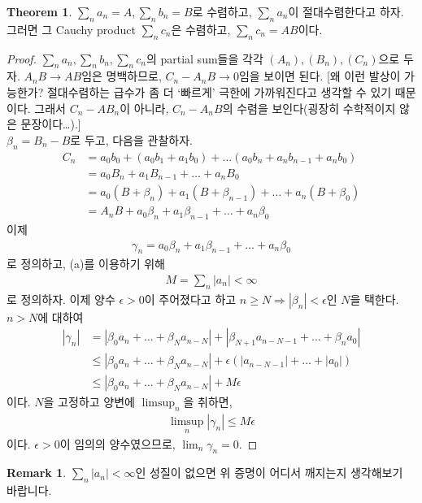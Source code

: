 \documentclass[12pt]{article}
\theoremstyle{definition}
\newtheorem{thm}{Theorem}[section]
\newtheorem*{rem}{Remark}
\def\eps{\epsilon}
\newcommand{\abs}[1]{\left\vert#1\right\vert}
\begin{document}
\begin{thm}
	\(\sum_n a_n=A, \sum_n b_n=B\)로 수렴하고, \(\sum_n a_n\)이 절대수렴한다고 하자. 그러면 그 Cauchy product \(\sum_n c_n\)은 수렴하고, \(\sum_n c_n = AB\)이다.
\end{thm}
\begin{proof}
	\(\sum_n a_n, \sum_n b_n, \sum_n c_n\)의 partial sum들을 각각 \((A_n), (B_n), (C_n)\)으로 두자. \(A_n B \rightarrow AB\)임은 명백하므로, \(C_n - A_n B \rightarrow 0\)임을 보이면 된다. [왜 이런 발상이 가능한가? 절대수렴하는 급수가 좀 더 `빠르게' 극한에 가까워진다고 생각할 수 있기 때문이다. 그래서 \(C_n - A B_n\)이 아니라, \(C_n - A_n B\)의 수렴을 보인다(굉장히 수학적이지 않은 문장이다\ldots).]\\
	\(\beta_n = B_n - B\)로 두고, 다음을 관찰하자.
	\begin{align*}
		C_n &= a_0 b_0 + (a_0 b_1 + a_1 b_0) + \ldots (a_0 b_n + a_n b_{n-1} + a_n b_0)\\
		&= a_0 B_n + a_1 B_{n-1} + \ldots + a_n B_0\\
		&= a_0 (B + \beta_n) + a_1 (B + \beta_{n-1}) + \ldots + a_n (B + \beta_0)\\
		&= A_n B + a_0 \beta_n + a_1 \beta_{n-1} + \ldots + a_n \beta_0
	\end{align*}
	이제
	\begin{gather*}
		\gamma_n = a_0 \beta_n + a_1 \beta_{n-1} + \ldots + a_n \beta_0
	\end{gather*}
	로 정의하고, (a)를 이용하기 위해
	\begin{gather*}
		M = \sum_n \abs{a_n} < \infty
	\end{gather*}
	로 정의하자. 이제 양수 \(\eps > 0\)이 주어졌다고 하고 \(n \ge N \Rightarrow \abs{\beta_n} < \eps\)인 \(N\)을 택한다. \(n > N\)에 대하여
	\begin{align*}
		\abs{\gamma_n} &= \abs{\beta_0 a_n + \ldots + \beta_N a_{n-N}} + \abs{\beta_{N+1} a_{n-N-1} + \ldots + \beta_n a_0}\\
		& \le \abs{\beta_0 a_n + \ldots + \beta_N a_{n-N}} + \eps(\abs{a_{n-N-1}} + \ldots + \abs{a_0})\\
		& \le \abs{\beta_0 a_n + \ldots + \beta_N a_{n-N}} + M\eps
	\end{align*}
	이다. \(N\)을 고정하고 양변에 \(\limsup_n\)을 취하면,
	\begin{gather*}
		\limsup_n \abs{\gamma_n} \le M\eps
	\end{gather*}
	이다. \(\eps > 0\)이 임의의 양수였으므로, \(\lim_n \gamma_n = 0\).
\end{proof}
\begin{rem}
	\(\sum_n \abs{a_n} < \infty\)인 성질이 없으면 위 증명이 어디서 깨지는지 생각해보기 바랍니다.
\end{rem}
\end{document}
